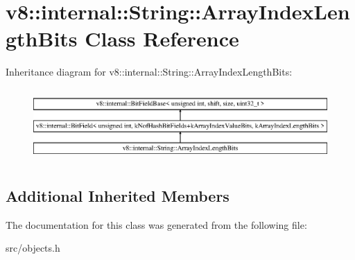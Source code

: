 \hypertarget{classv8_1_1internal_1_1_string_1_1_array_index_length_bits}{}\section{v8\+:\+:internal\+:\+:String\+:\+:Array\+Index\+Length\+Bits Class Reference}
\label{classv8_1_1internal_1_1_string_1_1_array_index_length_bits}
Inheritance diagram for v8\+:\+:internal\+:\+:String\+:\+:Array\+Index\+Length\+Bits\+:\begin{figure}[H]
\begin{center}
\leavevmode
\includegraphics[height=2.800000cm]{classv8_1_1internal_1_1_string_1_1_array_index_length_bits}
\end{center}
\end{figure}
\subsection*{Additional Inherited Members}


The documentation for this class was generated from the following file\+:\begin{DoxyCompactItemize}
\item 
src/objects.\+h\end{DoxyCompactItemize}
